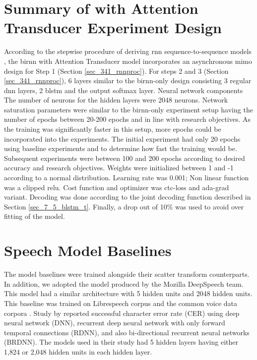 \section{Summary of  with Attention Transducer Experiment Design}
According to the stepwise procedure of deriving \acrshort{rnn} sequence-to-sequence models , the \acrshort{birnn} with Attention Transducer model incorporates an asynchronous \acrshort{mimo} design for Step 1 (Section \ref{sec_341_rnnproc}).  For steps 2 and 3 (Section \ref{sec_341_rnnproc}), 6 layers similar to the \acrshort{birnn}-only design consisting 3 regular \acrshort{dnn} layers, 2 \acrshort{blstm} and the output softmax layer. Neural network components  The number of neurons for the hidden layers were 2048 neurons.  Network saturation parameters were similar to the \acrshort{birnn}-only experiment setup having the number of epochs between 20-200 epochs and in line with research objectives.  As the training was significantly faster in this setup, more epochs could be incorporated into the experiments.  The initial experiment had only 20 epochs using baseline experiments and to determine how fast the training would be.  Subsequent experiments were between 100 and 200 epochs according to desired accuracy and research objectives.  Weights were initialized between 1 and -1 according to a normal distribution.  Learning rate was 0.001; Non linear function was a clipped \acrshort{relu}.  Cost function and optimizer was ctc-loss and ada-grad variant. Decoding was done according to the joint decoding function described in Section \ref{sec_7_5_blstm_t}.  Finally, a drop out of 10\% was used to avoid over fitting of the model.

\section{Speech Model Baselines}\label{sec_c7_baseline}
The model baselines were trained alongside their scatter transform counterparts.  In addition, we adopted the model produced by the Mozilla DeepSpeech team.  This model had a similar architecture with 5 hidden units and 2048 hidden units.  This baseline was trained on Librespeech corpus and the common voice data corpora \citep{panayotov2015librispeech, ardila2019common}.   Study by \cite{hannun2014first} reported successful character error rate (CER)  using deep neural network (DNN), recurrent deep neural network with only forward temporal connections (RDNN), and also bi-directional recurrent neural networks (BRDNN). The models used in their study had 5 hidden layers having either 1,824 or 2,048 hidden units in each hidden layer.  

